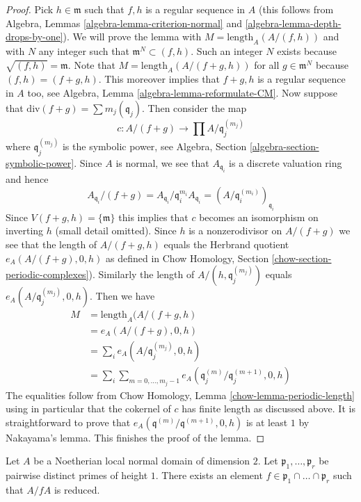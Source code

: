 \begin{proof}
Pick $h \in \mathfrak m$ such that $f, h$ is a regular sequence in $A$
(this follows from Algebra, Lemmas \ref{algebra-lemma-criterion-normal} and
\ref{algebra-lemma-depth-drops-by-one}).
We will prove the lemma with $M = \text{length}_A(A/(f, h))$ and with
$N$ any integer such that $\mathfrak m^N \subset (f, h)$. Such
an integer $N$ exists because $\sqrt{(f, h)} = \mathfrak m$. Note that
$M = \text{length}_A(A/(f + g, h))$ for all $g \in \mathfrak m^N$
because $(f, h) = (f + g, h)$. This moreover implies that $f + g, h$
is a regular sequence in $A$ too, see
Algebra, Lemma \ref{algebra-lemma-reformulate-CM}.
Now suppose that $\text{div}(f + g ) = \sum m_j (\mathfrak q_j)$.
Then consider the map
$$
c : A/(f + g) \longrightarrow \prod A/\mathfrak q_j^{(m_j)}
$$
where $\mathfrak q_j^{(m_j)}$ is the symbolic power, see
Algebra, Section \ref{algebra-section-symbolic-power}.
Since $A$ is normal, we see that $A_{\mathfrak q_i}$ is
a discrete valuation ring and hence
$$
A_{\mathfrak q_i}/(f + g) =
A_{\mathfrak q_i}/\mathfrak q_i^{m_i} A_{\mathfrak q_i} =
(A/\mathfrak q_i^{(m_i)})_{\mathfrak q_i}
$$
Since $V(f + g, h) = \{\mathfrak m\}$ this implies that $c$ becomes
an isomorphism on inverting $h$ (small detail omitted). Since $h$ is a
nonzerodivisor on $A/(f + g)$ we see that the length of $A/(f + g, h)$
equals the Herbrand quotient $e_A(A/(f + g), 0, h)$
as defined in Chow Homology, Section
\ref{chow-section-periodic-complexes}).
Similarly the length of $A/(h, \mathfrak q_j^{(m_j)})$ equals
$e_A(A/\mathfrak q_j^{(m_j)}, 0, h)$. Then we have
\begin{align*}
M & = \text{length}_A(A/(f + g, h) \\
& =
e_A(A/(f + g), 0, h) \\
& =
\sum\nolimits_i e_A(A/\mathfrak q_j^{(m_j)}, 0, h) \\
& =
\sum\nolimits_i \sum\nolimits_{m = 0, \ldots, m_j - 1}
e_A(\mathfrak q_j^{(m)}/\mathfrak q_j^{(m + 1)}, 0, h)
\end{align*}
The equalities follow from Chow Homology, Lemma
\ref{chow-lemma-periodic-length} using in particular that
the cokernel of $c$ has finite length as discussed above.
It is straightforward to prove that
$e_A(\mathfrak q^{(m)}/\mathfrak q^{(m + 1)}, 0, h)$
is at least $1$ by Nakayama's lemma. This finishes the proof of the lemma.
\end{proof}

\begin{lemma}
\label{lemma-radical-element}
Let $A$ be a Noetherian local normal domain of dimension $2$.
Let $\mathfrak p_1, \ldots, \mathfrak p_r$ be pairwise distinct
primes of height $1$. There exists an element
$f \in \mathfrak p_1 \cap \ldots \cap \mathfrak p_r$ such
that $A/fA$ is reduced.
\end{lemma}

